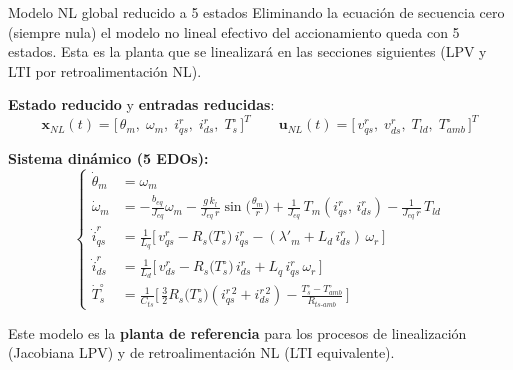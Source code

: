 \documentclass[aspectratio=169,t]{beamer}
\begin{document}
\begin{frame}{Modelo NL global reducido a 5 estados}
{\small\color{uncGray}Eliminando la ecuación de secuencia cero (siempre nula) el modelo no lineal efectivo del accionamiento queda con 5 estados. Esta es la planta que se linealizará en las secciones siguientes (LPV y LTI por retroalimentación NL).}\par
\vspace{2mm}

\textbf{Estado reducido} y \textbf{entradas reducidas}:
\begin{equation*}
\bm{x}_{NL}(t) = \big[\,\theta_m,\;\omega_m,\;i_{qs}^{r},\;i_{ds}^{r},\;T_s^\circ\,\big]^T
\qquad
\bm{u}_{NL}(t) = \big[\,v_{qs}^{r},\;v_{ds}^{r},\;T_{ld},\;T_{amb}^\circ\,\big]^T
\end{equation*}

\textbf{Sistema dinámico (5 EDOs):}
\footnotesize
\begin{equation*}
\left\{
\begin{aligned}
\dot{\theta}_m &= \omega_m \\
\dot{\omega}_m &= -\tfrac{b_{eq}}{J_{eq}}\omega_m - \tfrac{g\,k_l}{J_{eq}\,r}\sin\!\big(\tfrac{\theta_m}{r}\big) + \tfrac{1}{J_{eq}}\,T_m(i_{qs}^{r},\,i_{ds}^{r}) - \tfrac{1}{J_{eq}\,r}\,T_{ld} \\
\dot{i}_{qs}^{r} &= \tfrac{1}{L_q}\!\big[\,v_{qs}^{r} - R_s\!\big(T_s^\circ\big)\, i_{qs}^{r} - (\lambda'_m + L_d\,i_{ds}^{r})\,\omega_r\,\big] \\
\dot{i}_{ds}^{r} &= \tfrac{1}{L_d}\!\big[\,v_{ds}^{r} - R_s\!\big(T_s^\circ\big)\, i_{ds}^{r} + L_q\,i_{qs}^{r}\,\omega_r\,\big] \\
\dot{T}_s^\circ &= \tfrac{1}{C_{ts}}\!\big[\,\tfrac{3}{2}R_s\!\big(T_s^\circ\big)(i_{qs}^{r\,2}+i_{ds}^{r\,2}) - \tfrac{T_s^\circ - T_{amb}^\circ}{R_{ts\text{-}amb}}\,\big]
\end{aligned}\right.
\end{equation*}
\normalsize

\vspace{1mm}
{\small Este modelo es la \textbf{planta de referencia} para los procesos de linealización (Jacobiana LPV) y de retroalimentación NL (LTI equivalente).}
\end{frame}
\end{document}
